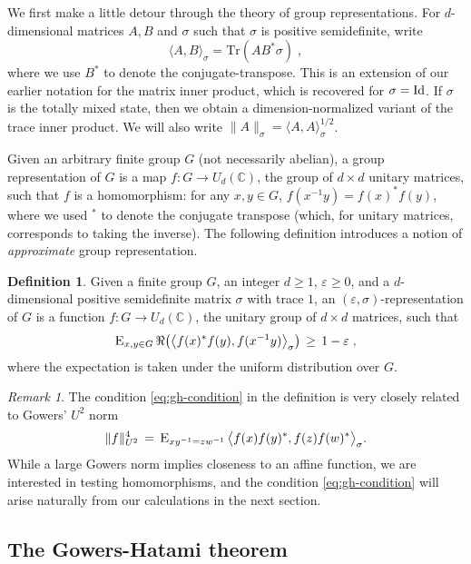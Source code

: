 \documentclass{report}
\theoremstyle{plain}
\theoremstyle{definition}
\newtheorem{definition}[subsection]{Definition}
\theoremstyle{remark}
\newtheorem{remark}[subsection]{Remark}
\newcommand{\Id}{\ensuremath{\mathop{\rm Id}\nolimits}}
\newcommand{\Es}[1]{\textsc{E}_{#1}}
\newcommand{\C}{\ensuremath{\mathbb{C}}}
\newcommand{\eps}{\varepsilon}
\numberwithin{equation}{subsection}
\begin{document}
We first make a little detour through the theory of group representations. For $d$-dimensional matrices  $A,B$ and $\sigma$ such that $\sigma$ is positive semidefinite, write 
$$\langle A,B\rangle_\sigma = \mathrm{Tr}(AB^* \sigma)\;,$$
where we use $B^*$ to denote the conjugate-transpose. This is an extension of our earlier notation for the matrix inner product, which is recovered for $\sigma = \Id$. If $\sigma$ is the totally mixed state, then we obtain a dimension-normalized variant of the trace inner product. We will also write $\|A\|_\sigma = \langle A,A\rangle_\sigma^{1/2}$. 

Given an arbitrary finite group $G$ (not necessarily abelian), a group representation of $G$ is a map $f:G \to U_d(\C)$, the group of $d\times d$ unitary matrices, such that $f$ is a homomorphism: for any $x,y\in G$, $f(x^{-1}y)=f(x)^* f(y)$, where we used $^*$ to denote the conjugate transpose (which, for unitary matrices, corresponds to taking the inverse). The following definition introduces a notion of \emph{approximate} group representation.  

\begin{definition}\label{def:approx-rep}
Given a finite group $G$, an integer $d\geq 1$, $\eps\geq 0$, and a $d$-dimensional positive semidefinite matrix $\sigma$ with trace $1$, an $(\eps,\sigma)$-representation of $G$ is a function $f: G \to U_d(\C)$, the unitary group of $d\times d$ matrices, such that 
\begin{equation}\label{eq:gh-condition}
\Es{x,y\in G} \,\Re\big(\big\langle f(x)^*f(y) ,f(x^{-1}y) \big\rangle_\sigma\big) \,\geq\, 1-\eps\;,
\end{equation} 
where the expectation is taken under the uniform distribution over $G$.
\end{definition}

\begin{remark}
The condition \eqref{eq:gh-condition} in the definition is very closely related to Gowers' $U^2$ norm
$$\|f\|_{U^2}^4 \,=\, \Es{xy^{-1}=zw^{-1}}\, \big\langle f(x)f(y)^* ,f(z)f(w)^* \big\rangle_\sigma.$$
While a large Gowers norm implies closeness to an affine function, we are interested in testing homomorphisms, and the condition \eqref{eq:gh-condition} will arise naturally from our calculations in the next section. 
\end{remark}

\subsection{The Gowers-Hatami theorem}
\label{section:ghtheorem}
\end{document}
